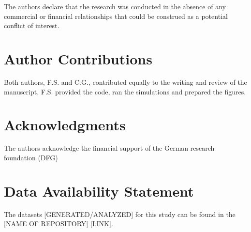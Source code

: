 \documentclass[utf8]{frontiersSCNS} %
\begin{document}
The authors declare that the research was conducted in the absence of any commercial or financial relationships that could be construed as a potential conflict of interest.

\section*{Author Contributions}

Both authors, F.S. and C.G., contributed equally to the
writing and review of the manuscript. F.S. provided the code,
ran the simulations and prepared the figures.


\section*{Acknowledgments}

The authors acknowledge the financial support of
the German research foundation (DFG)

\section*{Data Availability Statement}
The datasets [GENERATED/ANALYZED] for this study can be found in the [NAME OF REPOSITORY] [LINK].


\end{document}
